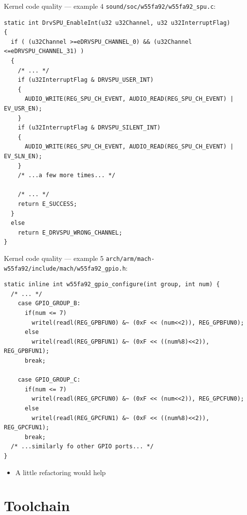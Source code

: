 \documentclass[xetex,table,aspectratio=169]{beamer}
\begin{document}
\begin{frame}[fragile]{Kernel code quality --- example 4}
  \texttt{sound/soc/w55fa92/w55fa92\_spu.c}:

  \linespread{0.5}
  \begin{verbatim}
static int DrvSPU_EnableInt(u32 u32Channel, u32 u32InterruptFlag)
{
  if ( (u32Channel >=eDRVSPU_CHANNEL_0) && (u32Channel <=eDRVSPU_CHANNEL_31) )
  {
    /* ... */
    if (u32InterruptFlag & DRVSPU_USER_INT)
    {
      AUDIO_WRITE(REG_SPU_CH_EVENT, AUDIO_READ(REG_SPU_CH_EVENT) | EV_USR_EN);
    }
    if (u32InterruptFlag & DRVSPU_SILENT_INT)
    {
      AUDIO_WRITE(REG_SPU_CH_EVENT, AUDIO_READ(REG_SPU_CH_EVENT) | EV_SLN_EN);
    }
    /* ...a few more times... */

    /* ... */
    return E_SUCCESS;
  }
  else
    return E_DRVSPU_WRONG_CHANNEL;
}
  \end{verbatim}
\end{frame}

\begin{frame}[fragile]{Kernel code quality --- example 5}
  \texttt{arch/arm/mach-w55fa92/include/mach/w55fa92\_gpio.h}:

  \linespread{1}
  \begin{verbatim}
static inline int w55fa92_gpio_configure(int group, int num) {
  /* ... */
    case GPIO_GROUP_B:
      if(num <= 7)
        writel(readl(REG_GPBFUN0) &~ (0xF << (num<<2)), REG_GPBFUN0);
      else
        writel(readl(REG_GPBFUN1) &~ (0xF << ((num%8)<<2)), REG_GPBFUN1);
      break;

    case GPIO_GROUP_C:
      if(num <= 7)
        writel(readl(REG_GPCFUN0) &~ (0xF << (num<<2)), REG_GPCFUN0);
      else
        writel(readl(REG_GPCFUN1) &~ (0xF << ((num%8)<<2)), REG_GPCFUN1);
      break;
  /* ...similarly fo other GPIO ports... */
}
  \end{verbatim}

  \begin{itemize}
  \item A little refactoring would help
  \end{itemize}
\end{frame}

\section{Toolchain}
\end{document}
